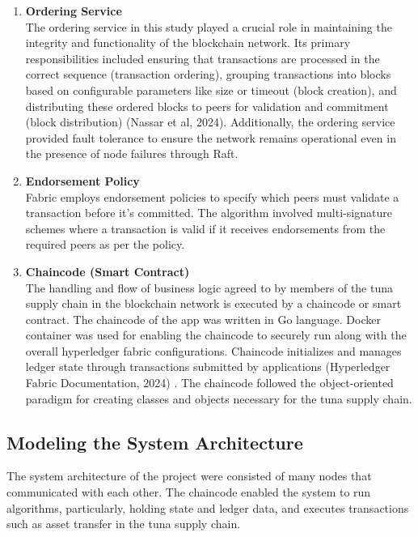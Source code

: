 \begin{enumerate}
	\item \textbf{Ordering Service} \\ The ordering service in this study played a crucial role in maintaining the integrity and functionality of the blockchain network. Its primary responsibilities included ensuring that transactions are processed in the correct sequence (transaction ordering), grouping transactions into blocks based on configurable parameters like size or timeout (block creation), and distributing these ordered blocks to peers for validation and commitment (block distribution) (Nassar et al, 2024)\nocite{method-3}. Additionally, the ordering service provided fault tolerance to ensure the network remains operational even in the presence of node failures through Raft.
	
	\item \textbf{Endorsement Policy} \\Fabric employs endorsement policies to specify which peers must validate a transaction before it's committed. The algorithm involved multi-signature schemes where a transaction is valid if it receives endorsements from the required peers as per the policy.
	
	\item \textbf{Chaincode (Smart Contract)} \\The handling and flow of business logic agreed to by members of the tuna supply chain in the blockchain network is executed by a chaincode or smart contract. The chaincode of the app was written in Go language. Docker container was used for enabling the chaincode to securely run along with the overall hyperledger fabric configurations. Chaincode initializes and manages ledger state through transactions submitted by applications (Hyperledger Fabric Documentation, 2024) \nocite{method-4}. The chaincode followed the object-oriented paradigm for creating classes and objects necessary for the tuna supply chain.
	
	
\end{enumerate}

\subsection{Modeling the System Architecture}
The system architecture of the project were consisted of many nodes that communicated with each other. The chaincode enabled the system to run algorithms, particularly, holding state and ledger data, and executes transactions such as asset transfer in the tuna supply chain. 

